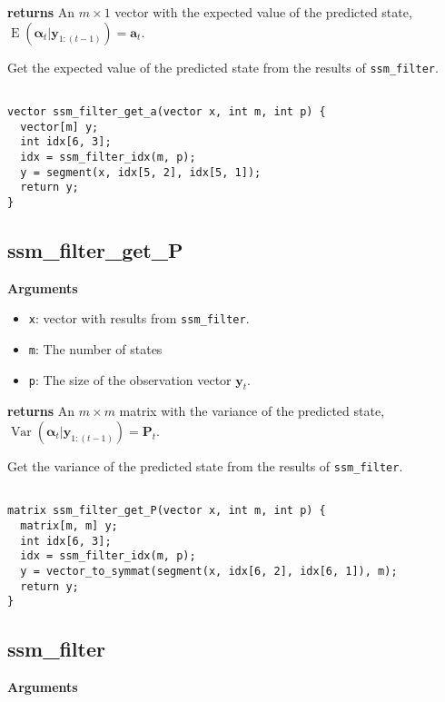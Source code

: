 \documentclass[]{book}
\providecommand{\tightlist}{%
  \setlength{\itemsep}{0pt}\setlength{\parskip}{0pt}}
\DeclareMathOperator{\E}{E}
\DeclareMathOperator{\Var}{Var}
\newcommand{\mat}[1]{\boldsymbol{#1}}
\renewcommand{\vec}[1]{\boldsymbol{#1}}
\begin{document}
\textbf{returns} An \(m \times 1\) vector with the expected value of the
predicted state, \(\E(\vec{\alpha}_t | \vec{y}_{1:(t-1)}) = \vec{a}_t\).

Get the expected value of the predicted state from the results of
\texttt{ssm\_filter}.

\begin{verbatim}

vector ssm_filter_get_a(vector x, int m, int p) {
  vector[m] y;
  int idx[6, 3];
  idx = ssm_filter_idx(m, p);
  y = segment(x, idx[5, 2], idx[5, 1]);
  return y;
}

\end{verbatim}

\subsection{ssm\_filter\_get\_P}\label{ssm_filter_get_p}

\textbf{Arguments}

\begin{itemize}
\tightlist
\item
  \texttt{x}: vector with results from \texttt{ssm\_filter}.
\item
  \texttt{m}: The number of states
\item
  \texttt{p}: The size of the observation vector \(\vec{y}_t\).
\end{itemize}

\textbf{returns} An \(m \times m\) matrix with the variance of the
predicted state,
\(\Var(\vec{\alpha}_t | \vec{y}_{1:(t-1)}) = \mat{P}_t\).

Get the variance of the predicted state from the results of
\texttt{ssm\_filter}.

\begin{verbatim}

matrix ssm_filter_get_P(vector x, int m, int p) {
  matrix[m, m] y;
  int idx[6, 3];
  idx = ssm_filter_idx(m, p);
  y = vector_to_symmat(segment(x, idx[6, 2], idx[6, 1]), m);
  return y;
}

\end{verbatim}

\subsection{ssm\_filter}\label{ssm_filter}

\textbf{Arguments}
\end{document}
